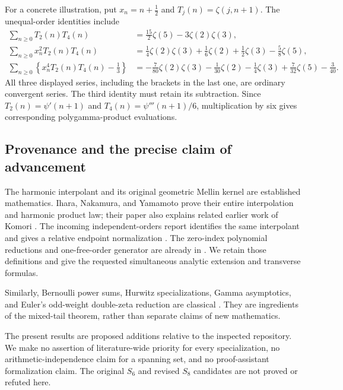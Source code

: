 For a concrete illustration, put $x_n=n+\tfrac12$ and
$T_j(n)=\zeta(j,n+1)$. The unequal-order identities include
\begin{align}
 \sum_{n\geq0}T_2(n)T_4(n)
  &=\frac{15}{2}\zeta(5)-3\zeta(2)\zeta(3),\label{scope:first}\\
 \sum_{n\geq0}x_n^2T_2(n)T_4(n)
  &=\frac14\zeta(2)\zeta(3)+\frac16\zeta(2)
       +\frac12\zeta(3)-\frac58\zeta(5),\label{scope:second}\\
 \sum_{n\geq0}\left\{x_n^4T_2(n)T_4(n)-\frac13\right\}
  &=-\frac7{80}\zeta(2)\zeta(3)-\frac1{30}\zeta(2)
       -\frac14\zeta(3)+\frac7{32}\zeta(5)-\frac3{40}.
       \label{scope:third}
\end{align}
All three displayed series, including the brackets in the last one,
are ordinary convergent series. The third identity must retain its
subtraction. Since $T_2(n)=\psi'(n+1)$ and
$T_4(n)=\psi'''(n+1)/6$, multiplication by six gives corresponding
polygamma-product evaluations.

\subsection{Provenance and the precise claim of advancement}

The harmonic interpolant and its original geometric Mellin kernel are
established mathematics. Ihara, Nakamura, and Yamamoto prove their
entire interpolation and harmonic product law; their paper also
explains related earlier work of Komori
\cite[Proposition 3.3, Theorem 4.1, Corollary 4.2]{INY}.
The incoming independent-orders report identifies the same interpolant
and gives a relative endpoint normalization \cite{IncomingIndependent}.
The zero-index polynomial reductions and one-free-order generator are
already in \cite{IncomingParity}. We retain those definitions and give
the requested simultaneous analytic extension and transverse formulas.

Similarly, Bernoulli power sums, Hurwitz specializations, Gamma
asymptotics, and Euler's odd-weight double-zeta reduction are classical
\cite{DLMFHurwitz,DLMFGamma,DLMFBernoulli,Bradley2007}.
They are ingredients of the mixed-tail theorem, rather than separate
claims of new mathematics.

The present results are proposed additions relative to the inspected
repository. We make no assertion of literature-wide priority for every
specialization, no arithmetic-independence claim for a spanning set, and
no proof-assistant formalization claim. The original $S_6$ and revised
$S_8$ candidates are not proved or refuted here.


